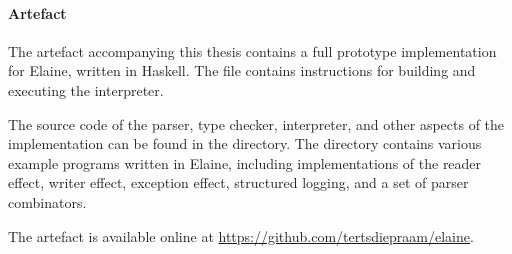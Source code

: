 \paragraph{Artefact}
The artefact accompanying this thesis contains a full prototype implementation for Elaine, written in Haskell. The  file contains instructions for building and executing the interpreter.

The source code of the parser, type checker, interpreter, and other aspects of the implementation can be found in the  directory. The  directory contains various example programs written in Elaine, including implementations of the reader effect, writer effect, exception effect, structured logging, and a set of parser combinators.

The artefact is available online at \url{https://github.com/tertsdiepraam/elaine}.
